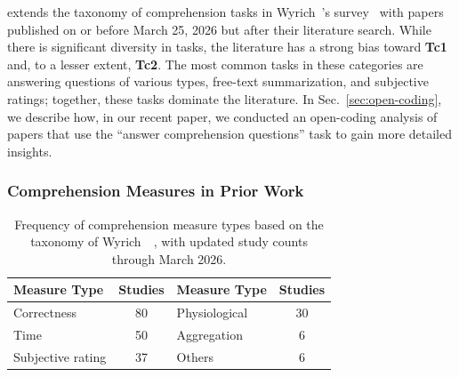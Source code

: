  extends the taxonomy of comprehension tasks in Wyrich~\etal's survey~\cite{Wyrich:ACS23}
with papers published on or before March 25, 2026 but after their literature search.
While there is significant diversity in tasks, 
the literature has a strong bias toward \textbf{Tc1} and, to a lesser extent, 
\textbf{Tc2}. The most common tasks in these categories are answering questions of 
various types, free-text summarization, and subjective ratings; together, these 
tasks dominate the literature. In Sec.~\ref{sec:open-coding}, we describe how, in our recent paper, we conducted an open-coding analysis of papers that use the ``answer comprehension questions'' task to gain more detailed insights.

\subsubsection{Comprehension Measures in Prior Work}
\label{sec:rw-measures}

\begin{table}[t]
\centering
\small
\renewcommand{\arraystretch}{1.1}
\caption{Frequency of comprehension measure types based on the taxonomy of Wyrich~\etal~\cite{Wyrich:ACS23}, with updated study counts through March 2026.}
\begin{tabular}{lclc}
\toprule
Measure Type & Studies & Measure Type & Studies \\
\midrule
Correctness & 80 & Physiological & 30 \\
Time & 50 & Aggregation & 6 \\
Subjective rating & 37 & Others & 6 \\
\bottomrule
\end{tabular}
\label{tab:measures}
\end{table}
 
